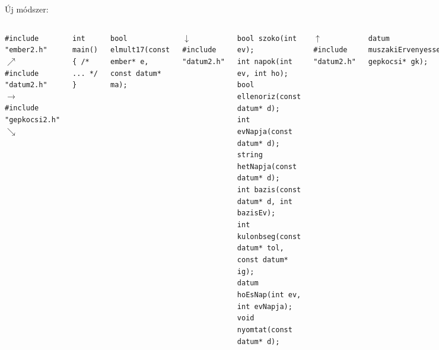 \documentclass[usenames,dvipsnames,aspectratio=169]{beamer}
\begin{document}
\begin{frame}
  Új módszer:\\
  \begin{columns}[c]
      \hfill \texttt{\#include "ember2.h"} $\nearrow$ \\
      \hfill \texttt{\#include "datum2.h"} $\rightarrow$ \\
      \hfill \texttt{\#include "gepkocsi2.h"} $\searrow$ \\
      \begin{exampleblock}{}
        \texttt{int main() \{ /* ... */ \}}\\
      \end{exampleblock}
      \begin{exampleblock}{}
        \texttt{bool elmult17(const ember* e, const datum* ma);}\\
      \end{exampleblock}
      $\downarrow$ \texttt{\#include "datum2.h"}\\
      \begin{exampleblock}{}
        \texttt{bool szoko(int ev);}\\
        \texttt{int napok(int ev, int ho);}\\
        \texttt{bool ellenoriz(const datum* d);}\\
        \texttt{int evNapja(const datum* d);}\\
        \texttt{string hetNapja(const datum* d);}\\
        \texttt{int bazis(const datum* d, int bazisEv);}\\
        \texttt{int kulonbseg(const datum* tol, const datum* ig);}\\
        \texttt{datum hoEsNap(int ev, int evNapja);}\\
        \texttt{void nyomtat(const datum* d);}\\
      \end{exampleblock}
      $\uparrow$ \texttt{\#include "datum2.h"}\\
      \begin{exampleblock}{}
        \texttt{datum muszakiErvenyesseg(const gepkocsi* gk);}\\
      \end{exampleblock}
  \end{columns}
\end{frame}
\end{document}
